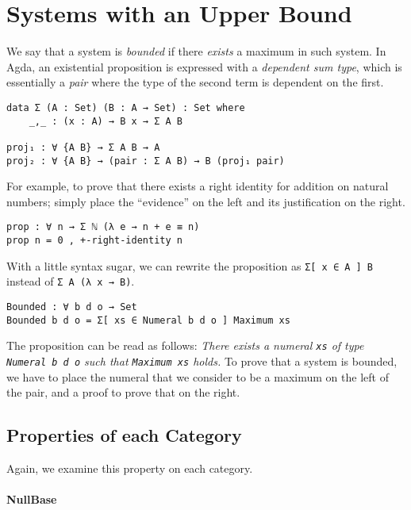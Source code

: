 \documentclass[\main/thesis.tex]{subfiles}
\begin{document}
\section{Systems with an Upper Bound}\label{bounded}

We say that a system is \textit{bounded} if there \textit{exists} a maximum in
such system. In Agda, an existential proposition is expressed with
a \textit{dependent sum type}, which is essentially a \textit{pair} where the
type of the second term is dependent on the first.

\begin{lstlisting}
data Σ (A : Set) (B : A → Set) : Set where
    _,_ : (x : A) → B x → Σ A B

proj₁ : ∀ {A B} → Σ A B → A
proj₂ : ∀ {A B} → (pair : Σ A B) → B (proj₁ pair)
\end{lstlisting}

For example, to prove that there exists a right identity for addition on natural numbers;
simply place the ``evidence'' on the left and its justification on the right.

\begin{lstlisting}
prop : ∀ n → Σ ℕ (λ e → n + e ≡ n)
prop n = 0 , +-right-identity n
\end{lstlisting}

With a little syntax sugar,  we can rewrite the proposition as
{\lstinline|Σ[ x ∈ A ] B|} instead of {\lstinline|Σ A (λ x → B)|}.

\begin{lstlisting}
Bounded : ∀ b d o → Set
Bounded b d o = Σ[ xs ∈ Numeral b d o ] Maximum xs
\end{lstlisting}

The proposition can be read as follows:
\textit{There exists a numeral {\lstinline|xs|} of type {\lstinline|Numeral b d o|}
such that {\lstinline|Maximum xs|} holds.}
To prove that a system is bounded, we have to place the numeral that we consider
to be a maximum on the left of the pair, and a proof to prove that on the right.

\subsection{Properties of each Category}

Again, we examine this property on each category.

\paragraph{NullBase}
\end{document}
